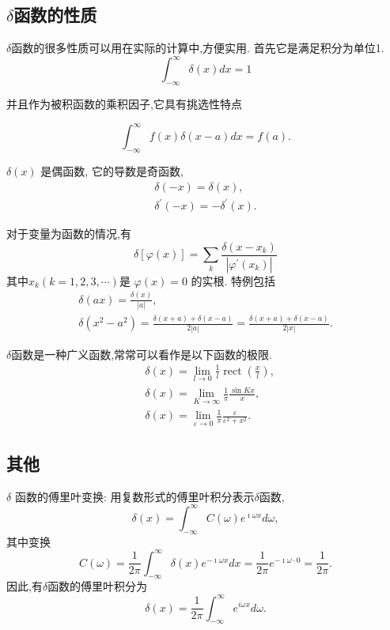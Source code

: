 \subsection{\texorpdfstring{$\delta$}{delta}函数的性质}
$\delta$函数的很多性质可以用在实际的计算中,方便实用. 首先它是满足积分为单位1.
$$
\int_{-\infty}^{\infty} \delta(x) d x=1
$$

并且作为被积函数的乘积因子,它具有挑选性特点

$$
\int_{-\infty}^{\infty} f(x) \delta(x-a) d x=f(a).
$$

$\delta(x)$ 是偶函数, 它的导数是奇函数,
$$
\begin{gathered}
\delta(-x)=\delta(x), \\
\delta^{\prime}(-x)=-\delta^{\prime}(x) .
\end{gathered}
$$

对于变量为函数的情况,有
\begin{equation}
    \delta[\varphi(x)]=\sum_k \frac{\delta\left(x-x_k\right)}{\left|\varphi^{\prime}\left(x_k\right)\right|}
\end{equation}
其中$x_k(k=1,2,3, \cdots)$是
$\varphi(x)=0$ 的实根.
特例包括
\begin{equation}
    \begin{gathered}
    \delta(a x)=\frac{\delta(x)}{|a|}, \\
    \delta\left(x^2-a^2\right)=\frac{\delta(x+a)+\delta(x-a)}{2|a|}=\frac{\delta(x+a)+\delta(x-a)}{2|x|} .
    \end{gathered}
\end{equation}

$\delta$函数是一种广义函数,常常可以看作是以下函数的极限.
\begin{equation}
    \begin{aligned}
    & \delta(x)=\lim _{l \rightarrow 0} \frac{1}{l} \operatorname{rect}\left(\frac{x}{l}\right), \\
    & \delta(x)=\lim _{K \rightarrow \infty} \frac{1}{\pi} \frac{\sin K x}{x}, \\
    & \delta(x)=\lim _{\varepsilon \rightarrow 0} \frac{1}{\pi} \frac{\varepsilon}{\varepsilon^2+x^2} .
    \end{aligned}
\end{equation}

\subsection{其他}
$\delta$ 函数的傅里叶变换: 用复数形式的傅里叶积分表示$\delta$函数,
\begin{equation}
\delta(x)=\int_{-\infty}^{\infty} C(\omega) e^{\imath\omega x} d \omega,
\end{equation}
其中变换
$$
C(\omega)=\frac{1}{2 \pi} \int_{-\infty}^{\infty} \delta(x) e^{-\imath\omega x} d x=\frac{1}{2 \pi} e^{-\imath\omega \cdot 0}=\frac{1}{2 \pi} .
$$
因此,有$\delta$函数的傅里叶积分为
\begin{equation}
\delta(x)=\frac{1}{2 \pi} \int_{-\infty}^{\infty} e^{i \omega x} d \omega .
\end{equation}

